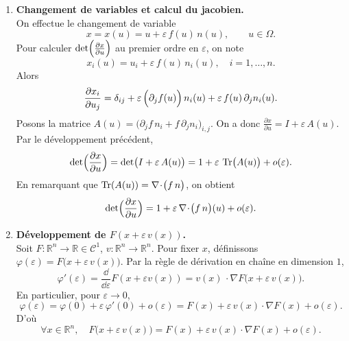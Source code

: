 \documentclass[a4paper,10pt]{report}
\newcommand{\diff}[1]{\frac{\dd}{\dd #1}}
\newcommand{\RR}{\mathbb{R}}
\begin{document}
\begin{enumerate}
			\item \textbf{Changement de variables et calcul du jacobien.}\\
			On effectue le changement de variable
			\[
			x = x(u) = u + \varepsilon\,f(u)\,n(u), 
			\qquad u \in \Omega.
			\]
			Pour calculer 
			\( \det\Bigl(\frac{\partial x}{\partial u}\Bigr)\) au premier ordre en \(\varepsilon\), on note
			\[
			x_i(u) = u_i + \varepsilon\,f(u)\,n_i(u), 
			\quad i=1,\dots,n.
			\]
			Alors 
			\[
			\frac{\partial x_i}{\partial u_j}
			= \delta_{ij} 
			+ \varepsilon\,\Bigl(\partial_j f(u)\Bigr)\,n_i(u)
			+ \varepsilon\,f(u)\,\partial_j n_i(u).
			\]
			Posons la matrice 
			\(\displaystyle A(u) = \bigl(\partial_j f\,n_i + f\,\partial_j n_i\bigr)_{i,j}\). 
			On a donc 
			\(\displaystyle \frac{\partial x}{\partial u} = I + \varepsilon\,A(u)\). 
			Par le développement précédent,
			\[
			\det\Bigl(\frac{\partial x}{\partial u}\Bigr) 
			= \det\bigl(I + \varepsilon\,A(u)\bigr) 
			= 1 + \varepsilon\,\Tr\bigl(A(u)\bigr) + o(\varepsilon).
			\]
			En remarquant que \(\Tr(A(u)) = \nabla \!\cdot\!\bigl(f\,n\bigr)\), on obtient
			\[
			\det\Bigl(\frac{\partial x}{\partial u}\Bigr) 
			= 1 + \varepsilon\,\nabla\!\cdot\!\bigl(f\,n\bigr)(u) + o(\varepsilon).
			\]
			
			\item \textbf{Développement de \(F(x + \varepsilon\,v(x))\).}\\
			Soit \(F : \RR^n \to \RR\in \mathcal{C}^1\), \(v : \RR^n \to \RR^n\). Pour fixer \(x\), définissons 
			\(\varphi(\varepsilon) = F\bigl(x + \varepsilon\,v(x)\bigr)\). 
			Par la règle de dérivation en chaîne en dimension \(1\),
			\[
			\varphi'(\varepsilon) 
			= \diff{\varepsilon} F(x + \varepsilon v(x))  = v(x)\,\cdot \nabla F\bigl(x + \varepsilon\,v(x)\bigr).
			\]
			En particulier, pour \(\varepsilon \to 0\),
			\[
			\varphi(\varepsilon) 
			= \varphi(0) + \varepsilon\,\varphi'(0) + o(\varepsilon) 
			= F(x) + \varepsilon\,v(x)\cdot\nabla F(x) + o(\varepsilon).
			\]
			D’où 
			\[
			\forall x\in\RR^n,\quad 
			F\bigl(x + \varepsilon\,v(x)\bigr)
			= F(x) + \varepsilon\,v(x)\cdot\nabla F(x) + o(\varepsilon).
			\]
			

\end{enumerate}
\end{document}
